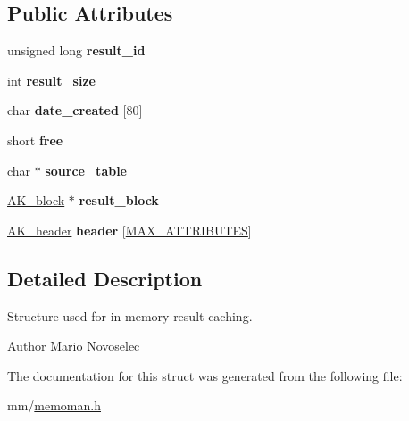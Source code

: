 \subsection*{Public Attributes}
\begin{DoxyCompactItemize}
\item 
\mbox{\label{structAK__results_a711198cb42416424b8ac85a9a5c33666}} 
unsigned long {\bfseries result\+\_\+id}
\item 
\mbox{\label{structAK__results_a0247e1e7bc724494fa4d834412785f65}} 
int {\bfseries result\+\_\+size}
\item 
\mbox{\label{structAK__results_a5eac49f04f7882ab4c0e7552cbfd1b61}} 
char {\bfseries date\+\_\+created} \mbox{[}80\mbox{]}
\item 
\mbox{\label{structAK__results_a76737ffacf19dd180b856a8bf28f7cb1}} 
short {\bfseries free}
\item 
\mbox{\label{structAK__results_a3bbe860a120adfff7f78b228785abae9}} 
char $\ast$ {\bfseries source\+\_\+table}
\item 
\mbox{\label{structAK__results_aebd697e8f81547bb7b4c27ff944e5913}} 
\hyperlink{structAK__block}{A\+K\+\_\+block} $\ast$ {\bfseries result\+\_\+block}
\item 
\mbox{\label{structAK__results_adce1e1dcd808bb24a122661aa7fbfe7b}} 
\hyperlink{structAK__header}{A\+K\+\_\+header} {\bfseries header} \mbox{[}\hyperlink{constants_8h_a4d992a1f9192388588184753115f6c03}{M\+A\+X\+\_\+\+A\+T\+T\+R\+I\+B\+U\+T\+ES}\mbox{]}
\end{DoxyCompactItemize}


\subsection{Detailed Description}
Structure used for in-\/memory result caching. 

\begin{DoxyAuthor}{Author}
Mario Novoselec 
\end{DoxyAuthor}


The documentation for this struct was generated from the following file\+:\begin{DoxyCompactItemize}
\item 
mm/\hyperlink{memoman_8h}{memoman.\+h}\end{DoxyCompactItemize}
